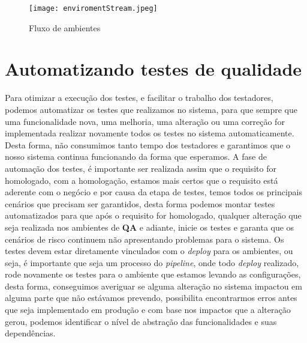       \begin{figure}[!h]
        \centering
        \texttt{[image: enviromentStream.jpeg]}
        \caption{Fluxo de ambientes}
        \label{Imagem:2}
      \end{figure}

    \section{Automatizando testes de qualidade}
      Para otimizar a execução dos testes, e facilitar o trabalho dos testadores,
      podemos automatizar os testes que realizamos no sistema, para que sempre que
      uma funcionalidade nova, uma melhoria, uma alteração ou uma correção for
      implementada realizar novamente todos os testes no sistema automaticamente.
      Desta forma, não consumimos tanto tempo dos testadores e garantimos que o
      nosso sistema continua funcionando da forma que esperamos. A fase de automação
      dos testes, é importante ser realizada assim que o requisito for homologado,
      com a homologação, estamos mais certos que o requisito está aderente com o
      negócio e por causa da etapa de testes, temos todos os principais cenários
      que precisam ser garantidos, desta forma podemos montar testes automatizados
      para que após o requisito for homologado, qualquer alteração que seja realizada
      nos ambientes de \textbf{QA} e adiante, inicie os testes e garanta que os
      cenários de risco continuem não apresentando problemas para o sistema. \newline
      Os testes devem estar diretamente vinculados com o \textit{deploy} para os
      ambientes, ou seja, é importante que seja um processo do \textit{pipeline},
      onde todo \textit{deploy} realizado, rode novamente os testes para o ambiente
      que estamos levando as configurações, desta forma, conseguimos averiguar se
      alguma alteração no sistema impactou em alguma parte que não estávamos prevendo,
      possibilita encontrarmos erros antes que seja implementado em produção e
      com base nos impactos que a alteração gerou, podemos identificar o nível de
      abstração das funcionalidades e suas dependências.

